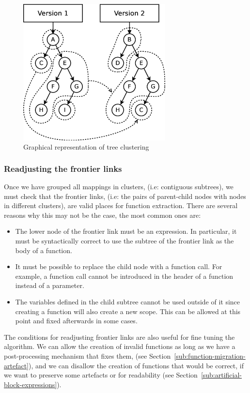 \begin{figure}
\centering
\includegraphics[width=0.69\textwidth]{figures/automatic_beh_inf/diagrams/dia3}
\par

\caption{Graphical representation of tree clustering\label{fig:tree-clustering-example}}
\end{figure}



\subsubsection{Readjusting the frontier links}

Once we have grouped all mappings in clusters, (i.e: contiguous subtrees),
we must check that the frontier links, (i.e: the pairs of parent-child
nodes with nodes in different clusters), are valid places for function
extraction. There are several reasons why this may not be the case,
the most common ones are:
\begin{itemize}
\item The lower node of the frontier link must be an expression. In particular,
it must be syntactically correct to use the subtree of the frontier link
as the body of a function.
\item It must be possible to replace the child node with a function call.
For example, a function call cannot be introduced in the header of
a function instead of a parameter.
\item The variables defined in the child subtree cannot be used outside
of it since creating a function will also create a new scope. This
can be allowed at this point and fixed afterwards in some cases.
\end{itemize}
The conditions for readjusting frontier links are also useful for fine
tuning the algorithm. We can allow the creation of invalid functions
as long as we have a post-processing mechanism that fixes them, (see
Section~\ref{sub:function-migration-artefact}), and we can disallow
the creation of functions that would be correct, if we want to preserve
some artefacts or for readability (see
Section~\ref{sub:artificial-block-expressions}).

